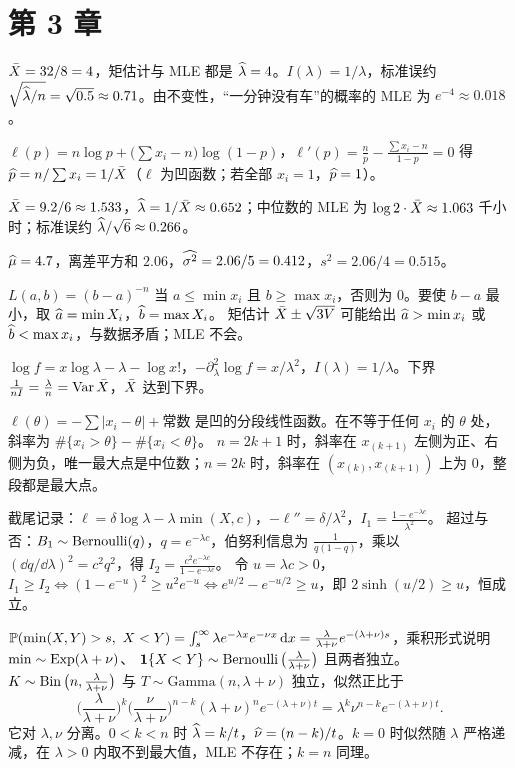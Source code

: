 \section*{第 3 章}

$\bar{X}=32/8=4$，矩估计与 MLE 都是 $\widehat{\lambda}=4$。$I(\lambda)=1/\lambda$，标准误约 $\sqrt{\widehat{\lambda}/n}=\sqrt{0.5}\approx0.71$。由不变性，“一分钟没有车”的概率的 MLE 为 $e^{-4}\approx0.018$。

$\ell(p)=n\log p+\big(\sum x_i-n\big)\log(1-p)$，$\ell'(p)=\frac np-\frac{\sum x_i-n}{1-p}=0$ 得 $\widehat{p}=n/\sum x_i=1/\bar{X}$（$\ell$ 为凹函数；若全部 $x_i=1$，$\widehat{p}=1$）。

$\bar{X}=9.2/6\approx1.533$，$\widehat{\lambda}=1/\bar{X}\approx0.652$；中位数的 MLE 为 $\log2\cdot\bar{X}\approx1.063$ 千小时；标准误约 $\widehat{\lambda}/\sqrt6\approx0.266$。

$\widehat{\mu}=4.7$，离差平方和 $2.06$，$\widehat{\sigma^2}=2.06/5=0.412$，$s^2=2.06/4=0.515$。

$L(a,b)=(b-a)^{-n}$ 当 $a\le\min x_i$ 且 $b\ge\max x_i$，否则为 $0$。要使 $b-a$ 最小，取 $\widehat{a}=\min X_i$，$\widehat{b}=\max X_i$。
矩估计 $\bar{X}\pm\sqrt{3V}$ 可能给出 $\widehat{a}>\min x_i$ 或 $\widehat{b}<\max x_i$，与数据矛盾；MLE 不会。

$\log f=x\log\lambda-\lambda-\log x!$，$-\partial_\lambda^2\log f=x/\lambda^2$，$I(\lambda)=1/\lambda$。下界 $\frac{1}{nI}=\frac\lambda n=\operatorname{Var}\bar{X}$，$\bar{X}$ 达到下界。

$\ell(\theta)=-\sum|x_i-\theta|+\text{常数}$ 是凹的分段线性函数。在不等于任何 $x_i$ 的 $\theta$ 处，斜率为 $\#\{x_i>\theta\}-\#\{x_i<\theta\}$。
$n=2k+1$ 时，斜率在 $x_{(k+1)}$ 左侧为正、右侧为负，唯一最大点是中位数；$n=2k$ 时，斜率在 $(x_{(k)},x_{(k+1)})$ 上为 $0$，整段都是最大点。

截尾记录：$\ell=\delta\log\lambda-\lambda\min(X,c)$，$-\ell''=\delta/\lambda^2$，$I_1=\frac{1-e^{-\lambda c}}{\lambda^2}$。
超过与否：$B_1\sim\operatorname{Bernoulli}(q)$，$q=e^{-\lambda c}$，伯努利信息为 $\frac1{q(1-q)}$，乘以 $(\dd q/\dd\lambda)^2=c^2q^2$，得 $I_2=\frac{c^2e^{-\lambda c}}{1-e^{-\lambda c}}$。
令 $u=\lambda c>0$，$I_1\ge I_2\iff(1-e^{-u})^2\ge u^2e^{-u}\iff e^{u/2}-e^{-u/2}\ge u$，即 $2\sinh(u/2)\ge u$，恒成立。

$\P(\min(X,Y)>s,\ X<Y)=\int_s^\infty\lambda e^{-\lambda x}e^{-\nu x}\dd x=\frac{\lambda}{\lambda+\nu}e^{-(\lambda+\nu)s}$，乘积形式说明 $\min\sim\operatorname{Exp}(\lambda+\nu)$、
$\mathbf{1}\{X<Y\}\sim\operatorname{Bernoulli}\big(\frac{\lambda}{\lambda+\nu}\big)$ 且两者独立。$K\sim\operatorname{Bin}\big(n,\frac{\lambda}{\lambda+\nu}\big)$ 与 $T\sim\mathrm{Gamma}(n,\lambda+\nu)$ 独立，似然正比于
\[
\Big(\frac{\lambda}{\lambda+\nu}\Big)^k\Big(\frac{\nu}{\lambda+\nu}\Big)^{n-k}(\lambda+\nu)^ne^{-(\lambda+\nu)t}=\lambda^k\nu^{n-k}e^{-(\lambda+\nu)t}.
\]
它对 $\lambda,\nu$ 分离。$0<k<n$ 时 $\widehat{\lambda}=k/t$，$\widehat{\nu}=(n-k)/t$。$k=0$ 时似然随 $\lambda$ 严格递减，在 $\lambda>0$ 内取不到最大值，MLE 不存在；$k=n$ 同理。

